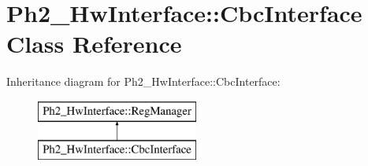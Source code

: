 \hypertarget{class_ph2___hw_interface_1_1_cbc_interface}{\section{Ph2\-\_\-\-Hw\-Interface\-:\-:Cbc\-Interface Class Reference}
\label{class_ph2___hw_interface_1_1_cbc_interface}
}
Inheritance diagram for Ph2\-\_\-\-Hw\-Interface\-:\-:Cbc\-Interface\-:\begin{figure}[H]
\begin{center}
\leavevmode
\includegraphics[height=2.000000cm]{class_ph2___hw_interface_1_1_cbc_interface}
\end{center}
\end{figure}
